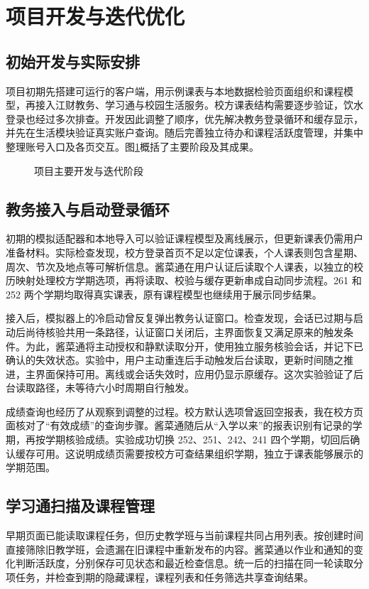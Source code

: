 \section{项目开发与迭代优化}

\subsection{初始开发与实际安排}
项目初期先搭建可运行的客户端，用示例课表与本地数据检验页面组织和课程模型，再接入江财教务、学习通与校园生活服务。校方课表结构需要逐步验证，饮水登录也经过多次排查。开发因此调整了顺序，优先解决教务登录循环和缓存显示，并先在生活模块验证真实账户查询。随后完善独立待办和课程活跃度管理，并集中整理账号入口及各页交互。图\ref{fig:timeline}概括了主要阶段及其成果。

\begin{figure}[htbp]
\centering
\caption{项目主要开发与迭代阶段}\label{fig:timeline}
\end{figure}

\subsection{教务接入与启动登录循环}
初期的模拟适配器和本地导入可以验证课程模型及离线展示，但更新课表仍需用户准备材料。实际检查发现，校方登录首页不足以定位课表，个人课表则包含星期、周次、节次及地点等可解析信息。酱菜通在用户认证后读取个人课表，以独立的校历映射处理校方学期选项，再将读取、校验与缓存更新串成自动同步流程。261 和 252 两个学期均取得真实课表，原有课程模型也继续用于展示同步结果。

接入后，模拟器上的冷启动曾反复弹出教务认证窗口。检查发现，会话已过期与启动后尚待核验共用一条路径，认证窗口关闭后，主界面恢复又满足原来的触发条件。为此，酱菜通将主动授权和静默读取分开，使用独立服务核验会话，并记下已确认的失效状态。实验中，用户主动重连后手动触发后台读取，更新时间随之推进，主界面保持可用。离线或会话失效时，应用仍显示原缓存。这次实验验证了后台读取路径，未等待六小时周期自行触发。

成绩查询也经历了从观察到调整的过程。校方默认选项曾返回空报表，我在校方页面核对了“有效成绩”的查询步骤。酱菜通随后从“入学以来”的报表识别有记录的学期，再按学期核验成绩。实验成功切换 252、251、242、241 四个学期，切回后确认缓存可用。这说明成绩页需要按校方可查结果组织学期，独立于课表能够展示的学期范围。

\subsection{学习通扫描及课程管理}
早期页面已能读取课程任务，但历史教学班与当前课程共同占用列表。按创建时间直接筛除旧教学班，会遗漏在旧课程中重新发布的内容。酱菜通以作业和通知的变化判断活跃度，分别保存可见状态和最近检查信息。统一后的扫描在同一轮读取分项任务，并检查到期的隐藏课程，课程列表和任务筛选共享查询结果。

